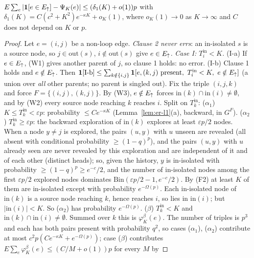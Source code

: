 \begin{proposition}\label{prop:er-red}
$E\sum_e|\mathbf 1[e\in E_{\uparrow}]-\Psi_K(e)|\le(\delta_1(K)+o(1))p$ with
$\delta_1(K)=C(c^2+K^2)e^{-\kappa K}+o_K(1)$, where $o_K(1)\to0$ as $K\to\infty$
and $C$ does not depend on $K$ or $p$.
\end{proposition}
\begin{proof}
Let $e=(i,j)$ be a non-loop edge. \emph{Clause 2 never errs}: an in-isolated $s$
is a source node, so $j\in\mathrm{out}(s)$, $i\notin\mathrm{out}(s)$ give
$e\in E_{\uparrow}$. \emph{Case I: $T^{\mathrm{in}}_i<K$.} (I-a) If $e\in E_{\uparrow}$, (W1) gives
another parent of $j$, so clause 1 holds: no error. (I-b) Clause 1 holds and
$e\notin E_{\uparrow}$. Then
$\mathbf 1[\text{I-b}]\le\sum_{k\notin\{i,j\}}\mathbf 1[e,(k,j)\text{ present},\ T^{\mathrm{in}}_i<K,\ e\notin\Eu]$
(a union over \emph{all} other parents; no parent is singled out). Fix the
triple $(i,j,k)$ and force $F=\{(i,j),(k,j)\}$. By (W3), $e\notin E_{\uparrow}$ forces
$\mathrm{in}(k)\cap\mathrm{in}(i)\ne\emptyset$, and by (W2) every source node
reaching $k$ reaches $i$. Split on $T^{\mathrm{in}}_k$:
($\alpha_1$) $K\le T^{\mathrm{in}}_k<\varepsilon p$: probability $\le Ce^{-\kappa K}$
(Lemma~\ref{lem:er-l1}(a), backward, in $G^F$).
($\alpha_2$) $T^{\mathrm{in}}_k\ge\varepsilon p$: the backward exploration of
$\mathrm{in}(k)$ explores at least $\varepsilon p/2$ nodes. When a node $y\ne j$ is
explored, the pairs $(u,y)$ with $u$ unseen are revealed (all absent with
conditional probability $\ge(1-q)^p$), and the pairs $(u,y)$ with $u$ already
seen are never revealed by this exploration and are independent of it and of
each other (distinct heads); so, given the history, $y$ is in-isolated with
probability $\ge(1-q)^p\ge e^{-c}/2$, and the number of in-isolated nodes among
the first $\varepsilon p/2$ explored nodes dominates
$\mathrm{Bin}(\varepsilon p/2-1,e^{-c}/2)$. By (F2) at least $K$ of them are
in-isolated except with probability $e^{-\Omega(p)}$. Each in-isolated node of
$\mathrm{in}(k)$ is a source node reaching $k$, hence reaches $i$, so lies in
$\mathrm{in}(i)$; but $|\mathrm{in}(i)|<K$. So ($\alpha_2$) has probability
$e^{-\Omega(p)}$.
($\beta$) $T^{\mathrm{in}}_k<K$ and $\mathrm{in}(k)\cap\mathrm{in}(i)\ne\emptyset$.
Summed over $k$ this is $\varphi^\beta_K(e)$.
The number of triples is $p^3$ and each has both pairs present with probability
$q^2$, so cases ($\alpha_1$), ($\alpha_2$) contribute at most
$c^2p(Ce^{-\kappa K}+e^{-\Omega(p)})$; case ($\beta$) contributes
$E\sum_e\varphi^\beta_K(e)\le(C/M+o(1))p$ for every $M$ by

\end{proof}
